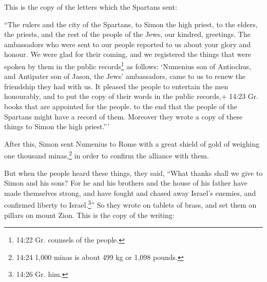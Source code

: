  This is the copy of the letters which the Spartans sent:

``The rulers and the city of the Spartans, to Simon the high priest, to
the elders, the priests, and the rest of the people of the Jews, our
kindred, greetings.  The ambassadors who were sent to our
people reported to us about your glory and honour. We were glad for
their coming,  and we registered the things that were
spoken by them in the public records\footnote{14:22 Gr. counsels of the
  people.} as follows: `Numenius son of Antiochus, and Antipater son of
Jason, the Jews' ambassadors, came to us to renew the friendship they
had with us.  It pleased the people to entertain the men
honourably, and to put the copy of their words in the public records,+
14:23 Gr. books that are appointed for the people. to the end that the
people of the Spartans might have a record of them. Moreover they wrote
a copy of these things to Simon the high priest.'''

 After this, Simon sent Numenius to Rome with a great
shield of gold of weighing one thousand minas,\footnote{14:24 1,000
  minas is about 499 kg or 1,098 pounds.} in order to confirm the
alliance with them.

 But when the people heard these things, they said, ``What
thanks shall we give to Simon and his sons?  For he and his
brothers and the house of his father have made themselves strong, and
have fought and chased away Israel's enemies, and confirmed liberty to
Israel.\footnote{14:26 Gr. him.}''  So they wrote on
tablets of brass, and set them on pillars on mount Zion. This is the
copy of the writing:

